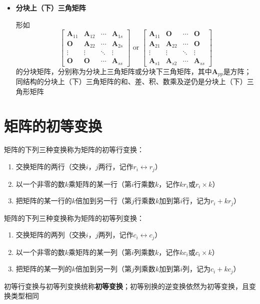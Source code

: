 \documentclass[UTF8]{ctexart}
\newcommand{\ve}[1]{{\bm{#1}}}
\newcommand{\mat}[1]{\ve{#1}}
\begin{document}
\begin{itemize}
  \item \textbf{分块上（下）三角矩阵}

  形如
  \[\begin{bmatrix}
  \mat{A}_{11}&\mat{A}_{12}&\cdots&\mat{A}_{1s}\\
  \mat{O}&\mat{A}_{22}&\cdots&\mat{A}_{2s}\\
  \vdots&\vdots&\ddots&\vdots\\
  \mat{O}&\mat{O}&\cdots&\mat{A}_{ss}
  \end{bmatrix}\text{ or }\begin{bmatrix}
  \mat{A}_{11}&\mat{O}&\cdots&\mat{O}\\
  \mat{A}_{21}&\mat{A}_{22}&\cdots&\mat{O}\\
  \vdots&\vdots&\ddots&\vdots\\
  \mat{A}_{s1}&\mat{A}_{s2}&\cdots&\mat{A}_{ss}
  \end{bmatrix}\]
  的分块矩阵，分别称为分块上三角矩阵或分块下三角矩阵，其中$\mat{A}_{pp}$是方阵；同结构的分块上（下）三角矩阵的和、差、积、数乘及逆仍是分块上（下）三角形矩阵
\end{itemize}

\section*{矩阵的初等变换}
矩阵的下列三种变换称为矩阵的初等行变换：
\begin{enumerate}
  \item 交换矩阵的两行（交换$i$，$j$两行，记作$r_i\leftrightarrow r_j$）
  \item 以一个非零的数$k$乘矩阵的某一行（第$i$行乘数$k$，记作$kr_i$或$r_i\times k$）
  \item 把矩阵的某一行的$k$倍加到另一行（第$j$行乘数$k$加到第$i$行，记为$r_i+kr_j$）
\end{enumerate}

矩阵的下列三种变换称为矩阵的初等列变换：
\begin{enumerate}
  \item 交换矩阵的两列（交换$i$，$j$两列，记作$c_i\leftrightarrow c_j$）
  \item 以一个非零的数$k$乘矩阵的某一列（第$i$列乘数$k$，记作$kc_i$或$c_i\times k$）
  \item 把矩阵的某一列的$k$倍加到另一列（第$j$列乘数$k$加到第$i$列，记为$c_i+kc_j$）
\end{enumerate}

初等行变换与初等列变换统称\textbf{初等变换}；初等别换的逆变换依然为初等变换，且变换类型相同
\end{document}
